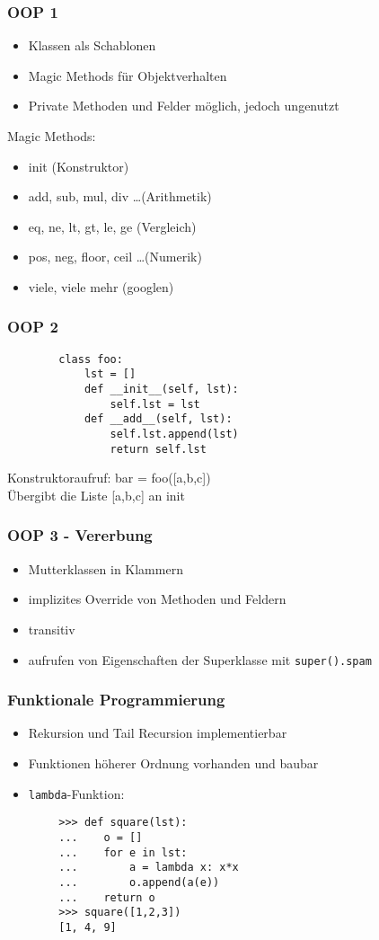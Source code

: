 \documentclass[handout]{beamer}
\begin{document}
\begin{frame}
	\frametitle{OOP 1}
	\begin{itemize}
		\item Klassen als Schablonen
		\item Magic Methods für Objektverhalten
		\item Private Methoden und Felder möglich, jedoch ungenutzt
	\end{itemize}
	Magic Methods:
	\begin{itemize}
		\item init (Konstruktor)
		\item add, sub, mul, div \dots (Arithmetik)
		\item eq, ne, lt, gt, le, ge (Vergleich)
		\item pos, neg, floor, ceil \dots (Numerik)
		\item viele, viele mehr (googlen)
	\end{itemize}
\end{frame}

\begin{frame}[fragile]
	\frametitle{OOP 2}
	\begin{lstlisting}
		class foo:
			lst = []
		    def __init__(self, lst):
		        self.lst = lst
		    def __add__(self, lst):
		        self.lst.append(lst)
		        return self.lst
	\end{lstlisting}
	Konstruktoraufruf: bar = foo([a,b,c])\\
	Übergibt die Liste [a,b,c] an init
\end{frame}

\begin{frame}[fragile]
	\frametitle{OOP 3 - Vererbung}
	\begin{itemize}
		\item Mutterklassen in Klammern
		\item implizites Override von Methoden und Feldern
		\item transitiv
		\item aufrufen von Eigenschaften der Superklasse mit \texttt{super().spam}
	\end{itemize}
\end{frame}

\begin{frame}[fragile]
	\frametitle{Funktionale Programmierung}
	\begin{itemize}
		\item Rekursion und Tail Recursion implementierbar
		\item Funktionen höherer Ordnung vorhanden und baubar
		\item \texttt{lambda}-Funktion:
	\end{itemize}
	\begin{lstlisting}
		>>> def square(lst):
		...    o = []
		...    for e in lst:
		...        a = lambda x: x*x
		...        o.append(a(e))
		...    return o
		>>> square([1,2,3])
		[1, 4, 9]
	\end{lstlisting}
\end{frame}
\end{document}
